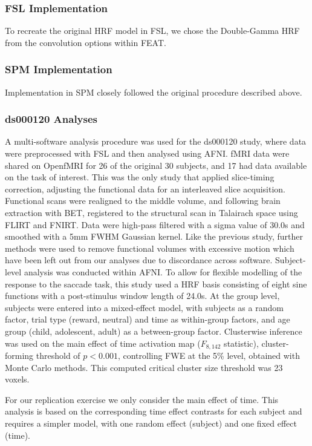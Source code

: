 \subsubsection{FSL Implementation}
To recreate the original HRF model in FSL, we chose the Double-Gamma HRF from the convolution options within FEAT. 

\subsubsection{SPM Implementation}
Implementation in SPM closely followed the original procedure described above.


\subsubsection{ds000120 Analyses}

A multi-software analysis procedure was used for the ds000120 study, where data were preprocessed with FSL and then analysed using AFNI. fMRI data were shared on OpenfMRI for 26 of the original 30 subjects, and 17 had data available on the task of interest. This was the only study that applied slice-timing correction, adjusting the functional data for an interleaved slice acquisition. Functional scans were realigned to the middle volume, and following brain extraction with BET, registered to the structural scan in Talairach space using FLIRT and FNIRT. Data were high-pass filtered with a sigma value of 30.0s and smoothed with a 5mm FWHM Gaussian kernel. Like the previous study, further methods were used to remove functional volumes with excessive motion which have been left out from our analyses due to discordance across software. Subject-level analysis was conducted within AFNI. To allow for flexible modelling of the response to the saccade task, this study used a HRF basis consisting of eight sine functions with a post-stimulus window length of 24.0s. At the group level, subjects were entered into a mixed-effect model, with subjects as a random factor, trial type (reward, neutral) and time as within-group factors, and age group (child, adolescent, adult) as a between-group factor. Clusterwise inference was used on the main effect of time activation map ($F_{8,142}$ statistic), cluster-forming threshold of $p < 0.001$, controlling FWE at the 5\% level, obtained with Monte Carlo methods. This computed critical cluster size threshold was 23 voxels. 

For our replication exercise we only consider the main effect of time.  This analysis is based on the corresponding time effect contrasts for each subject and requires a simpler model, with one random effect (subject) and one fixed effect (time). 



